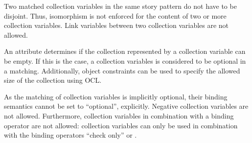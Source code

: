 {Two matched collection variables in the same story pattern do not have to be disjoint.
Thus, isomorphism is not enforced for the content of two or more collection variables.
Link variables between two collection variables are not allowed.

An attribute determines if the collection represented by a collection variable can be empty. 
If this is the case, a collection variables is considered to be optional in a
matching. Additionally, object constraints can be used to specify the allowed size of
the collection using OCL.

As the matching of collection variables is implicitly optional, their binding semantics cannot be set to ``optional'', explicitly.
Negative collection variables are not allowed.
Furthermore, collection variables in combination with a \create binding operator
are not allowed: collection variables can only be used in combination with the
binding operators ``check only'' or \destroy.






}%



